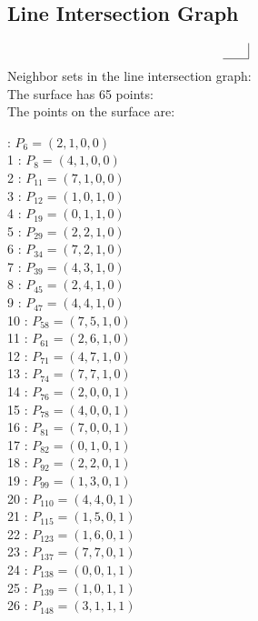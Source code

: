 \documentclass{article}
\begin{document}
{\subsection*{Line Intersection Graph}
{\arraycolsep=1pt
$$
\begin{array}{rr|*{0}r}
 & \\
\hline
\end{array}
$$
}%
Neighbor sets in the line intersection graph:\\
The surface has 65 points:\\
The points on the surface are:\\
\begin{multicols}{3}
 : $P_{6}=( 2, 1, 0, 0 )$\\
1 : $P_{8}=( 4, 1, 0, 0 )$\\
2 : $P_{11}=( 7, 1, 0, 0 )$\\
3 : $P_{12}=( 1, 0, 1, 0 )$\\
4 : $P_{19}=( 0, 1, 1, 0 )$\\
5 : $P_{29}=( 2, 2, 1, 0 )$\\
6 : $P_{34}=( 7, 2, 1, 0 )$\\
7 : $P_{39}=( 4, 3, 1, 0 )$\\
8 : $P_{45}=( 2, 4, 1, 0 )$\\
9 : $P_{47}=( 4, 4, 1, 0 )$\\
10 : $P_{58}=( 7, 5, 1, 0 )$\\
11 : $P_{61}=( 2, 6, 1, 0 )$\\
12 : $P_{71}=( 4, 7, 1, 0 )$\\
13 : $P_{74}=( 7, 7, 1, 0 )$\\
14 : $P_{76}=( 2, 0, 0, 1 )$\\
15 : $P_{78}=( 4, 0, 0, 1 )$\\
16 : $P_{81}=( 7, 0, 0, 1 )$\\
17 : $P_{82}=( 0, 1, 0, 1 )$\\
18 : $P_{92}=( 2, 2, 0, 1 )$\\
19 : $P_{99}=( 1, 3, 0, 1 )$\\
20 : $P_{110}=( 4, 4, 0, 1 )$\\
21 : $P_{115}=( 1, 5, 0, 1 )$\\
22 : $P_{123}=( 1, 6, 0, 1 )$\\
23 : $P_{137}=( 7, 7, 0, 1 )$\\
24 : $P_{138}=( 0, 0, 1, 1 )$\\
25 : $P_{139}=( 1, 0, 1, 1 )$\\
26 : $P_{148}=( 3, 1, 1, 1 )$\\

\end{multicols}}
\end{document}
